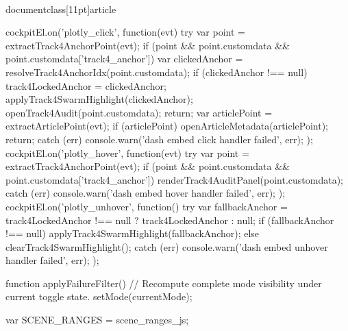 \\documentclass[11pt]{article}
\begin{document}
\begin{CodeBlock}
{{{{{{{{            cockpitEl.on('plotly_click', function(evt) {{
                try {{
                    var point = extractTrack4AnchorPoint(evt);
                    if (point && point.customdata && point.customdata['track4_anchor']) {{
                        var clickedAnchor = resolveTrack4AnchorIdx(point.customdata);
                        if (clickedAnchor !== null) {{
                            track4LockedAnchor = clickedAnchor;
                            applyTrack4SwarmHighlight(clickedAnchor);
                        }}
                        openTrack4Audit(point.customdata);
                        return;
                    }}
                    var articlePoint = extractArticlePoint(evt);
                    if (articlePoint) {{
                        openArticleMetadata(articlePoint);
                        return;
                    }}
                }} catch (err) {{
                    console.warn('dash embed click handler failed', err);
                }}
            }});
            cockpitEl.on('plotly_hover', function(evt) {{
                try {{
                    var point = extractTrack4AnchorPoint(evt);
                    if (point && point.customdata && point.customdata['track4_anchor']) {{
                        renderTrack4AuditPanel(point.customdata);
                    }}
                }} catch (err) {{
                    console.warn('dash embed hover handler failed', err);
                }}
            }});
            cockpitEl.on('plotly_unhover', function() {{
                try {{
                    var fallbackAnchor = track4LockedAnchor !== null ? track4LockedAnchor : null;
                    if (fallbackAnchor !== null) {{
                        applyTrack4SwarmHighlight(fallbackAnchor);
                    }} else {{
                        clearTrack4SwarmHighlight();
                    }}
                }} catch (err) {{
                    console.warn('dash embed unhover handler failed', err);
                }}
            }});
        }}



        function applyFailureFilter() {{
            // Recompute complete mode visibility under current toggle state.
            setMode(currentMode);
        }}

        var SCENE_RANGES = {scene_ranges_js};

}}}}}}
\end{CodeBlock}
\end{document}
